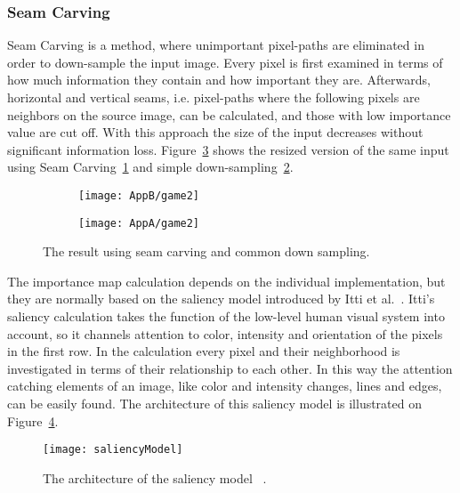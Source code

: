 \documentclass[draft,final]{vutinfth} %
\begin{document}
	\subsubsection{Seam Carving}
	\label{seamCarving}
	Seam Carving is a method, where unimportant pixel-paths are eliminated in order to down-sample the input image.
	Every pixel is first examined in terms of how much information they contain and how important they are.
	Afterwards, horizontal and vertical seams, i.e. pixel-paths where the following pixels are neighbors on the source image, can be calculated, and those with low importance value are cut off.
	With this approach the size of the input decreases without significant information loss.  
	Figure~\ref{fig:diff} shows the resized version of the same input using Seam Carving~\ref{fig:seamCarv} and simple down-sampling~\ref{fig:downSampl}.\par 
	\begin{figure}[H]
		\centering
		\begin{subfigure}[b]{0.45\columnwidth}
			\centering
			\texttt{[image: AppB/game2]}
			\label{fig:seamCarv}
		\end{subfigure}
		\begin{subfigure}[b]{0.45\columnwidth}
			\centering
			\texttt{[image: AppA/game2]}
			\label{fig:downSampl}
		\end{subfigure}
		\caption{The result using seam carving and common down sampling.}
		\label{fig:diff} %
	\end{figure}
	The importance map calculation depends on the individual implementation, but they are normally based on the saliency model introduced by Itti et al.~\cite{itti1998model}.
	Itti's saliency calculation takes the function of the low-level human visual system into account, so it channels attention to color, intensity and orientation of the pixels in the first row.
	In the calculation every pixel and their neighborhood is investigated in terms of their relationship to each other.
	In this way the attention catching elements of an image, like color and intensity changes, lines and edges, can be easily found. 
	The architecture of this saliency model is illustrated on Figure~\ref{fig:salMod}.\par 
	\begin{figure}[H]
		\centering		
		\texttt{[image: saliencyModel]}
		\caption{The architecture of the saliency model ~\cite{itti1998model}.}
		\label{fig:salMod}
	\end{figure}
\end{document}
